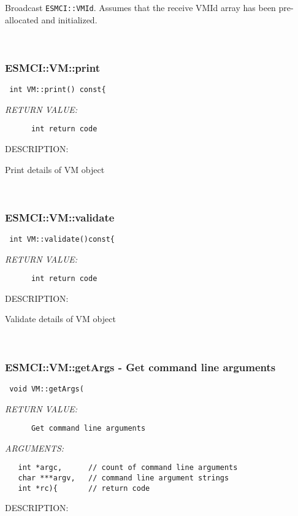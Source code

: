 {      Broadcast {\tt ESMCI::VMId}.  Assumes that the receive VMId
   array has been pre-allocated and initialized.
   
 
\mbox{}\hrulefill\
 
\subsubsection [ESMCI::VM::print] {ESMCI::VM::print}


  
\begin{verbatim} int VM::print() const{\end{verbatim}{\em RETURN VALUE:}
\begin{verbatim}      int return code\end{verbatim}
{\sf DESCRIPTION:\\ }


      Print details of VM object
   
 
\mbox{}\hrulefill\
 
\subsubsection [ESMCI::VM::validate] {ESMCI::VM::validate}


  
\begin{verbatim} int VM::validate()const{\end{verbatim}{\em RETURN VALUE:}
\begin{verbatim}      int return code\end{verbatim}
{\sf DESCRIPTION:\\ }


      Validate details of VM object
   
 
\mbox{}\hrulefill\
 
\subsubsection [ESMCI::VM::getArgs] {ESMCI::VM::getArgs - Get command line arguments}


  
\begin{verbatim} void VM::getArgs(\end{verbatim}{\em RETURN VALUE:}
\begin{verbatim}      Get command line arguments\end{verbatim}{\em ARGUMENTS:}
\begin{verbatim}   int *argc,      // count of command line arguments
   char ***argv,   // command line argument strings
   int *rc){       // return code\end{verbatim}
{\sf DESCRIPTION:\\ }


}
